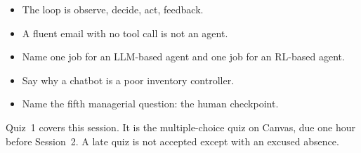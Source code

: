 \documentclass[11pt]{article}
\begin{document}
\begin{itemize}
\item The loop is observe, decide, act, feedback.
\item A fluent email with no tool call is not an agent.
\item Name one job for an LLM-based agent and one job for an RL-based agent.
\item Say why a chatbot is a poor inventory controller.
\item Name the fifth managerial question: the human checkpoint.
\end{itemize}

Quiz~1 covers this session. It is the multiple-choice quiz on Canvas, due one hour before Session~2. A late quiz is not accepted except with an excused absence.
\end{document}
